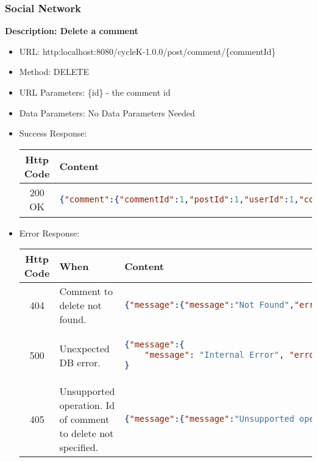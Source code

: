 \subsubsection*{Social Network}
\textbf{Description: Delete a comment}
\begin{itemize}
\item URL: http:localhost:8080/cycleK-1.0.0/post/comment/\{commentId\}
\item Method: DELETE
\item URL Parameters: \{id\} - the comment id
\item Data Parameters: No Data Parameters Needed
\item Success Response: 
\begin{longtable}{|c|p{13.5cm}|}
\hline
\textbf{Http Code} & \textbf{Content} \\\hline
200 OK  &
\begin{lstlisting}[language=json,firstnumber=1]
{"comment":{"commentId":1,"postId":1,"userId":1,"commentText":"Great job!"}}
\end{lstlisting}\\\hline
\end{longtable}

\item Error Response:
\begin{longtable}{|c|p{4cm}|p{9cm}|}
\hline
\textbf{Http Code} & \textbf{When} & \textbf{Content} \\\hline
404 &  Comment to delete not found. &
\begin{lstlisting}[language=json,firstnumber=1]
{"message":{"message":"Not Found","errorCode":"-324","errorDetails":"Comment not found","error":true}}
\end{lstlisting}\\\hline
500 & Unexpected DB error. & 
\begin{lstlisting}[language=json,firstnumber=1]
{"message":{
    "message": "Internal Error", "errorCode": "-327", "errorDetails": "Unexpected Error while deleting comment.", "error": true}
}
\end{lstlisting}\\\hline
405 &  Unsupported operation. Id of comment to delete not specified. &
\begin{lstlisting}[language=json,firstnumber=1]
{"message":{"message":"Unsupported operation","errorCode":"-902","errorDetails":"Unsupported operation for requested URI","error":true}}
\end{lstlisting}\\\hline
\end{longtable}
\end{itemize}
\newpage

